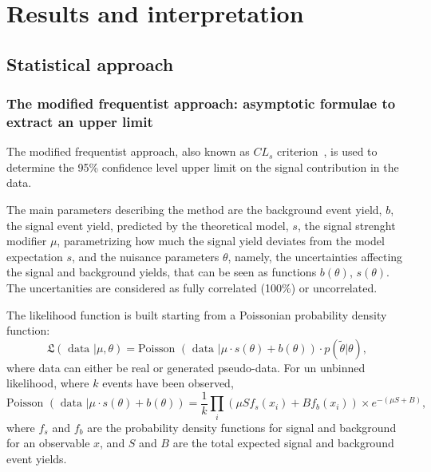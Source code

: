 \section{Results and interpretation}
\label{sec:results}

\subsection{Statistical approach}

\subsubsection{The modified frequentist approach: asymptotic formulae to extract an upper limit}

The modified frequentist approach, also known as $CL_s$ criterion~\cite{bib:CLS1,bib:CLS2,bib:LHC-HCG-Report}, is used to determine the 95\% confidence level upper limit on the signal contribution in the data.%

\noindent The main parameters describing the method are the background event yield, $b$, the signal event yield, predicted by the theoretical model, $s$, the signal strenght modifier $\mu$, parametrizing how much the signal yield deviates from the model expectation $s$, and the nuisance parameters $\theta$, namely, the uncertainties affecting the signal and background yields, that can be seen as functions $b(\theta)$, $s(\theta)$. The uncertanities are considered as fully correlated (100\%) or uncorrelated.

\noindent The likelihood function is built starting from a Poissonian probability density function:
\begin{equation}
\mathfrak{L} (\text{ data }| \mu, \theta) = \text{Poisson } (\text{ data } | \mu \cdot s(\theta) + b(\theta)) \cdot p (\tilde{\theta}| \theta),
\label{eq:likelihood}
\end{equation}
where data can either be real or generated pseudo-data. For un unbinned likelihood, where $k$ events have been observed,
\begin{equation}
\text{Poisson } (\text{ data } | \mu \cdot s(\theta) + b(\theta)) = \frac{1}{k} \prod_i \left( \mu S f_s(x_i) + B f_b (x_i) \right) \times e^{- (\mu S + B)},
\end{equation}
where $f_s$ and $f_b$ are the probability density functions for signal and background for an observable $x$, and $S$ and $B$ are the total expected signal and background event yields.


